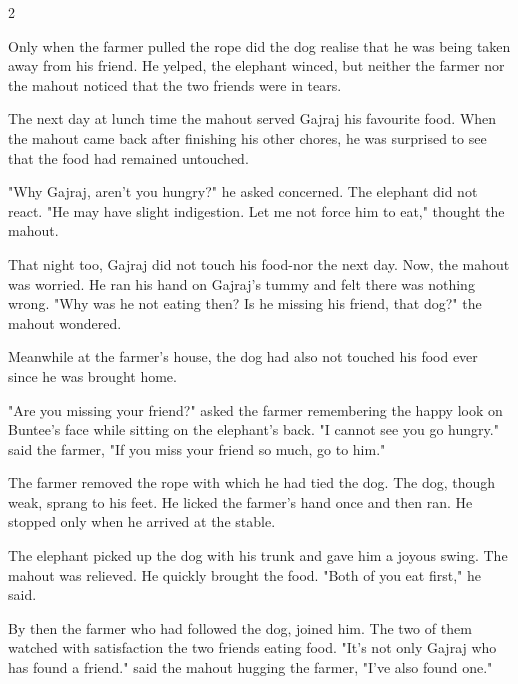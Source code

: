 \par
2
\par
Only when the farmer pulled the rope did the dog realise that he was being taken away from his friend. He yelped, the elephant winced, but neither the farmer nor the mahout noticed that the two friends were in tears.
\par
The next day at lunch time the mahout served Gajraj his favourite food. When the mahout came back after finishing his other chores, he was surprised to see that the food had remained untouched.
\par
"Why Gajraj, aren't you hungry?" he asked concerned. The elephant did not react. "He may have slight indigestion. Let me not force him to eat," thought the mahout.
\par
That night too, Gajraj did not touch his food-nor the next day. Now, the mahout was worried. He ran his hand on Gajraj's tummy and felt there was nothing wrong. "Why was he not eating then? Is he missing his friend, that dog?" the mahout wondered.
\par
Meanwhile at the farmer's house, the dog had also not touched his food ever since he was brought home.
\par
"Are you missing your friend?" asked the farmer remembering the happy look on Buntee's face while sitting on the elephant's back. "I cannot see you go hungry." said the farmer, "If you miss your friend so much, go to him."
\par
\vspace{0.1in}
The farmer removed the rope with which he had tied the dog. The dog, though weak, sprang to his feet. He licked the farmer's hand once and then ran. He stopped only when he arrived at the stable.
\par
The elephant picked up the dog with his trunk and gave him a joyous swing. The mahout was relieved. He quickly brought the food. "Both of you eat first," he said.
\par
By then the farmer who had followed the dog, joined him. The two of them watched with satisfaction the two friends eating food. "It's not only Gajraj who has found a friend." said the mahout hugging the farmer, "I've also found one."